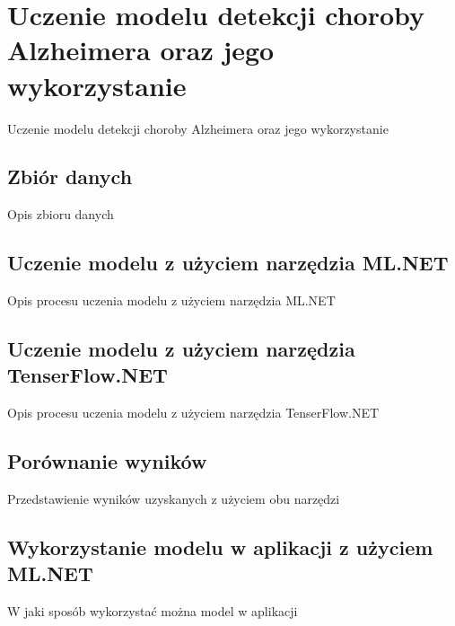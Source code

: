 \chapter{Uczenie modelu detekcji choroby Alzheimera oraz jego wykorzystanie}

Uczenie modelu detekcji choroby Alzheimera oraz jego wykorzystanie

\section{Zbiór danych}

Opis zbioru danych

\section{Uczenie modelu z użyciem narzędzia ML.NET}

Opis procesu uczenia modelu z użyciem narzędzia ML.NET

\section{Uczenie modelu z użyciem narzędzia TenserFlow.NET}

Opis procesu uczenia modelu z użyciem narzędzia TenserFlow.NET

\section{Porównanie wyników}

Przedstawienie wyników uzyskanych z użyciem obu narzędzi

\section{Wykorzystanie modelu w aplikacji z użyciem ML.NET}

W jaki sposób wykorzystać można model w aplikacji
